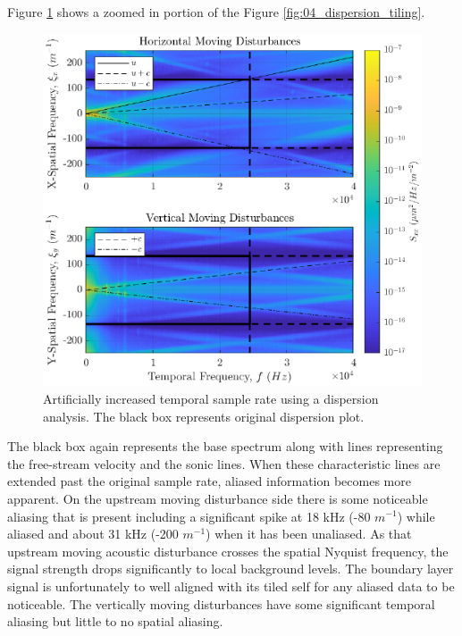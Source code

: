 Figure \ref{fig:04_dispersion_supersample} shows a zoomed in portion of the Figure \ref{fig:04_dispersion_tiling}.
\begin{figure}
  \centering
  \includegraphics{../matlab/04_dispersion_analysis/dispersion_supersample.eps}
  \caption{Artificially increased temporal sample rate using a dispersion analysis. The black box represents original dispersion plot.}
  \label{fig:04_dispersion_supersample}
\end{figure}
The black box again represents the base spectrum along with lines representing the free-stream velocity and the sonic lines.
When these characteristic lines are extended past the original sample rate, aliased information becomes more apparent.
On the upstream moving disturbance side there is some noticeable aliasing that is present including a significant spike at 18 kHz (-80 $m^{-1}$) while aliased and about 31 kHz (-200 $m^{-1}$) when it has been unaliased.
As that upstream moving acoustic disturbance crosses the spatial Nyquist frequency, the signal strength drops significantly to local background levels.
The boundary layer signal is unfortunately to well aligned with its tiled self for any aliased data to be noticeable.
The vertically moving disturbances have some significant temporal aliasing but little to no spatial aliasing.

